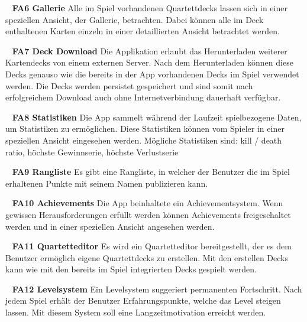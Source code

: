 \documentclass{scrartcl}
\begin{document}
\ \newline
\textbf{FA6 Gallerie} \newline
Alle im Spiel vorhandenen Quartettdecks lassen sich in einer speziellen Ansicht,
der Gallerie, betrachten. Dabei können alle im Deck enthaltenen Karten einzeln
in einer detaillierten Ansicht betrachtet werden.

\ \newline
\textbf{FA7 Deck Download} \newline
Die Applikation erlaubt das Herunterladen weiterer Kartendecks von einem
externen Server. Nach dem Herunterladen können diese Decks genauso wie die
bereits in der App vorhandenen Decks im Spiel verwendet werden. Die Decks werden
persistet gespeichert und sind somit nach erfolgreichem Download auch ohne
Internetverbindung dauerhaft verfügbar.

\ \newline
\textbf{FA8 Statistiken} \newline
Die App sammelt während der Laufzeit spielbezogene Daten, um Statistiken zu
ermöglichen. Diese Statistiken können vom Spieler in einer speziellen Ansicht
eingesehen werden. Mögliche Statistiken sind: kill / death ratio, höchste
Gewinnserie, höchste Verlustserie

\ \newline
\textbf{FA9 Rangliste} \newline
Es gibt eine Rangliste, in welcher der Benutzer die im Spiel erhaltenen Punkte
mit seinem Namen publizieren kann.

\ \newline
\textbf{FA10 Achievements} \newline
Die App beinhaltete ein Achievementsystem. Wenn gewissen Herausforderungen
erfüllt werden können Achievements freigeschaltet werden und in einer speziellen
Ansicht angesehen werden.

\ \newline
\textbf{FA11 Quartetteditor} \newline
Es wird ein Quartetteditor bereitgestellt, der es dem Benutzer ermöglich
eigene Quartettdecks zu erstellen. Mit den erstellen Decks kann wie mit den
bereits im Spiel integrierten Decks gespielt werden.

\ \newline
\textbf{FA12 Levelsystem} \newline
Ein Levelsystem suggeriert permanenten Fortschritt. Nach jedem Spiel erhält der
Benutzer Erfahrungspunkte, welche das Level steigen lassen. Mit diesem System
soll eine Langzeitmotivation erreicht werden.
\end{document}
